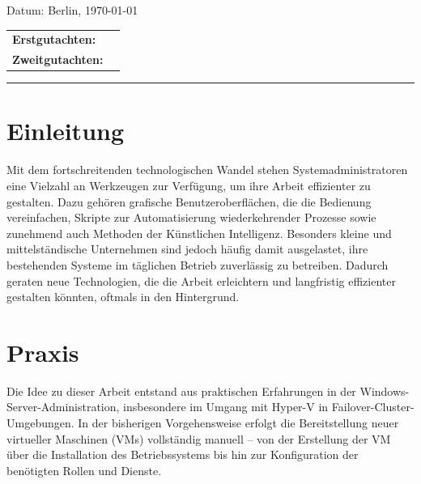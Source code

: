 \documentclass[a4paper,12pt]{article}
\begin{document}
\begin{titlepage}
    \begin{center}
        {\Large Datum: Berlin, \today}
    \end{center}


\begin{center}
    \begin{tabular}{ll}
        {\bfseries\large Erstgutachten:} &  \\
        {\bfseries\large Zweitgutachten:} &  \\
    \end{tabular}
\end{center}


    \textcolor{HTW}{\rule{\linewidth}{0.4mm}}

\end{titlepage}


\newpage

\tableofcontents

\newpage

\section{Einleitung}

Mit dem fortschreitenden technologischen Wandel stehen Systemadministratoren eine Vielzahl an Werkzeugen zur Verfügung, um ihre Arbeit effizienter zu gestalten. Dazu gehören grafische Benutzeroberflächen, die die Bedienung vereinfachen, Skripte zur Automatisierung wiederkehrender Prozesse sowie zunehmend auch Methoden der Künstlichen Intelligenz.
Besonders kleine und mittelständische Unternehmen sind jedoch häufig damit ausgelastet, ihre bestehenden Systeme im täglichen Betrieb zuverlässig zu betreiben. Dadurch geraten neue Technologien, die die Arbeit erleichtern und langfristig effizienter gestalten könnten, oftmals in den Hintergrund.\\

\section{Praxis}

Die Idee zu dieser Arbeit entstand aus praktischen Erfahrungen in der Windows-Server-Administration, insbesondere im Umgang mit Hyper-V in Failover-Cluster-Umgebungen. In der bisherigen Vorgehensweise erfolgt die Bereitstellung neuer virtueller Maschinen (VMs) vollständig manuell – von der Erstellung der VM über die Installation des Betriebssystems bis hin zur Konfiguration der benötigten Rollen und Dienste.\\
\end{document}
